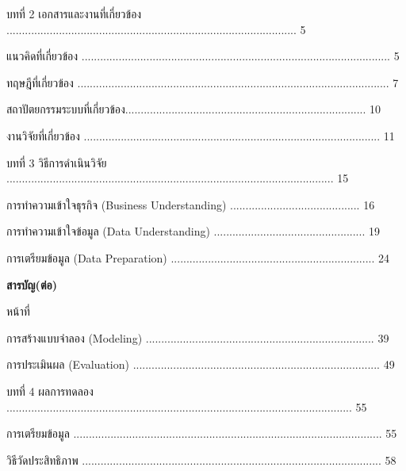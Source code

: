 \documentclass[12pt,a4paper]{report}
\begin{document}
บทที่ 2 เอกสารและงานที่เกี่ยวข้อง .............................................................................................. 5\par
{} แนวคิดที่เกี่ยวข้อง .................................................................................................... 5\par
{} ทฤษฎีที่เกี่ยวข้อง ..................................................................................................... 7\par
{} สถาปัตยกรรมระบบที่เกี่ยวข้อง.............................................................................. 10\par
{} งานวิจัยที่เกี่ยวข้อง ................................................................................................ 11\par
บทที่ 3 วิธีการดำเนินวิจัย .......................................................................................................... 15\par
{} การทำความเข้าใจธุรกิจ (Business Understanding) .......................................... 16\par
{} การทำความเข้าใจข้อมูล (Data Understanding) ................................................. 19\par
{} การเตรียมข้อมูล (Data Preparation) .................................................................. 24\par
\clearpage
\begin{center}\bfseries สารบัญ(ต่อ)\end{center}
หน้าที่\par
{} การสร้างแบบจำลอง (Modeling) .......................................................................... 39\par
{} การประเมินผล (Evaluation) ................................................................................ 49\par
บทที่ 4 ผลการทดลอง ................................................................................................................ 55\par
{} การเตรียมข้อมูล .................................................................................................... 55\par
{} วิธีวัดประสิทธิภาพ ................................................................................................. 58\par
\end{document}
